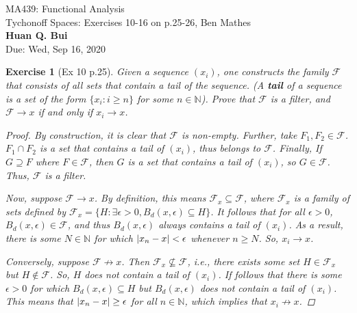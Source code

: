 \documentclass[11pt]{article}
\newtheorem{exercise}{Exercise}
\newcommand{\N}{\mathbb{N}}
\newcommand{\F}{\mathcal{F}}
\begin{document}
\begin{center}
\begin{framed}
{\Large  MA439: Functional Analysis\\
	 Tychonoff Spaces:  Exercises 10-16 on p.25-26, Ben Mathes}\\
$\,$\\
{\Large \bf  Huan Q. Bui\\}
$\,$\\
{\Large Due: Wed, Sep 16, 2020}
\end{framed}
\end{center}

\begin{exercise}[Ex 10 p.25]
Given a sequence $(x_i)$, one constructs the family $\mathcal{F}$ that consists of all sets that contain a tail of the sequence. (A \textbf{tail} of a sequence is a set of the form $\{x_i : i \geq n \}$ for some $n \in \mathbb{N}$). Prove that $\mathcal{F}$ is a filter, and $\mathcal{F} \to x$ if and only if $x_i \to x$.
	\begin{proof}
	By construction, it is clear that $\F$ is non-empty. Further, take $F_1,F_2\in \F$. $F_1\cap F_2$ is a set that contains a tail of $(x_i)$, thus belongs to $\F$. Finally, If $G\supseteq F$ where $F\in \F$, then $G$ is a set that contains a tail of $(x_i)$, so $G\in \F$. Thus, $\F$ is a filter. 
	
	Now, suppose $\F \to x$. By definition, this means $\F_x \subseteq \F$, where $\F_x$ is a family of sets defined by $\F_x = \{ H : \exists \epsilon > 0, B_d(x,\epsilon) \subseteq H \}$. It follows that for all $\epsilon > 0$, $B_d(x,\epsilon) \in \F$, and thus $B_d(x,\epsilon)$ always contains a tail of $(x_i)$. As a result, there is some $N \in \mathbb{N}$ for which $\abs{x_n - x} < \epsilon$ whenever $n \geq N$. So, $x_i \to x$.
	
	Conversely, suppose $\F \not\to x$. Then $\F_x \not\subseteq \F$, i.e., there exists some set $H\in \F_x$ but $H \not\in \F$. So, $H$ does not contain a tail of $(x_i)$. If follows that there is some $\epsilon > 0$ for which $B_d(x,\epsilon) \subseteq H$ but $B_d(x,\epsilon)$ does not contain a tail of $(x_i)$. This means that $\abs{x_n - x} \geq \epsilon$ for all $n\in \N$, which implies that $x_i \not\to x$.
	\end{proof}
\end{exercise}
\end{document}
